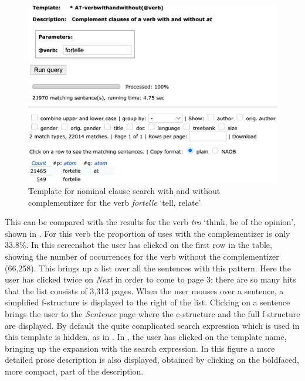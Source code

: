 \documentclass[output=paper,hidelinks]{langscibook}
\begin{document}
\begin{figure}
    \includegraphics[width=\textwidth]{figures/Treebanks/fortelle.png}
    \caption{Template for nominal clause search with and without complementizer for the verb \textit{fortelle} `tell, relate'}
    \label{fig:fortelle}
\end{figure}

This can be compared with the results for the verb \textit{tro} `think, be of the opinion', shown in .
For this verb the proportion of uses with the complementizer is only 33.8\%.
In this screenshot the user has clicked on the first row in the table, showing the number of occurrences for the verb without the complementizer (66,258).
This brings up a list over all the sentences with this pattern.
Here the user has clicked twice on \textit{Next} in order to come to page 3; there are so many hits that the list consists of 3,313 pages.
When the user mouses over a sentence, a simplified f-structure is displayed to the right of the list.
Clicking on a sentence brings the user to the \emph{Sentence} page where the c-structure and the full f-structure are displayed.
By default the quite complicated search expression which is used in this template is hidden, as in .
In , the user has clicked on the template name, bringing up the expansion with the search expression.
In this figure a more detailed prose description is also displayed, obtained by clicking on the boldfaced, more compact, part of the description.
\end{document}
